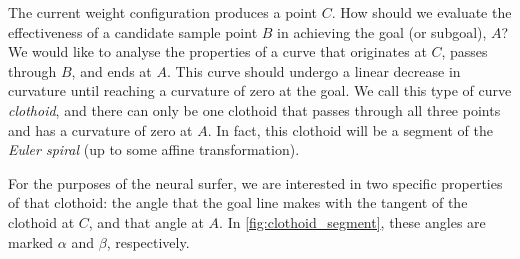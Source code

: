 The current weight configuration produces a point $C$. 
How should we evaluate the effectiveness of a candidate sample point $B$ in achieving the goal (or subgoal), $A$?
We would like to analyse the properties of a curve that originates at $C$, passes through $B$, and ends at $A$.
This curve should undergo a linear decrease in curvature until reaching a curvature of zero at the goal.
We call this type of curve \textit{clothoid}, and there can only be one clothoid that passes through all three points and has a curvature of zero at $A$.
In fact, this clothoid will be a segment of the \textit{Euler spiral} (up to some affine transformation).

For the purposes of the neural surfer, we are interested in two specific properties of that clothoid: the angle that the goal line makes with the tangent of the clothoid at $C$, and that angle at $A$.
In \ref{fig:clothoid_segment}, these angles are marked $\alpha$ and $\beta$, respectively.
